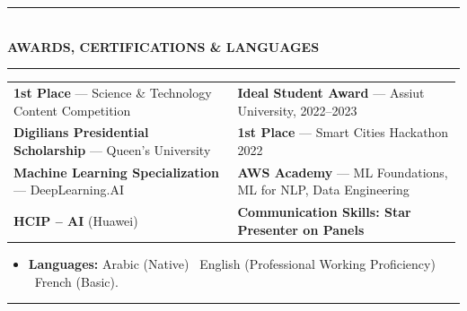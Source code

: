 \documentclass[10pt, a4paper]{article}
\makeatletter
\newcommand{\cvsection}[1]{%
  \vspace{3pt}%
  {\color{navy}\rule{\linewidth}{1.1pt}}\\[0.5pt]%
  {\color{navy}\bfseries\fontsize{9.5}{11}\selectfont\uppercase{#1}}\\[-4pt]%
  {\color{teal}\rule{\linewidth}{0.6pt}}%
  \vspace{2pt}%
}
\newenvironment{cvitems}{%
  \begin{itemize}[leftmargin=11pt, itemsep=0.5pt, parsep=0pt, topsep=1pt,
                  label={\textcolor{teal}{$\bullet$}}]
}{%
  \end{itemize}%
}
\newenvironment{dualcol}{%
  \begin{tabular*}{\linewidth}{@{}p{0.495\linewidth}@{\hspace{0.01\linewidth}}p{0.495\linewidth}@{}}
}{%
  \end{tabular*}%
}
\makeatother
\begin{document}
\cvsection{Awards, Certifications \& Languages}

\begin{dualcol}
  \textbf{1st Place} --- Science \& Technology Content Competition &
  \textbf{Ideal Student Award} --- Assiut University, 2022--2023 \\[2pt]
  \textbf{Digilians Presidential Scholarship} --- Queen's University &
  \textbf{1st Place} --- Smart Cities Hackathon 2022 \\[2pt]
  \textbf{Machine Learning Specialization} --- DeepLearning.AI &
  \textbf{AWS Academy} --- ML Foundations, ML for NLP, Data Engineering \\[2pt]
  \textbf{HCIP -- AI} (Huawei) &
  \textbf{Communication Skills: Star Presenter on Panels} \\
\end{dualcol}

\begin{cvitems}
  \item \textbf{Languages:} Arabic (Native) \textperiodcentered\ English (Professional Working Proficiency) \textperiodcentered\ French (Basic).
\end{cvitems}

\vspace{3pt}
{\color{navy}\rule{\linewidth}{0.8pt}}
\end{document}
